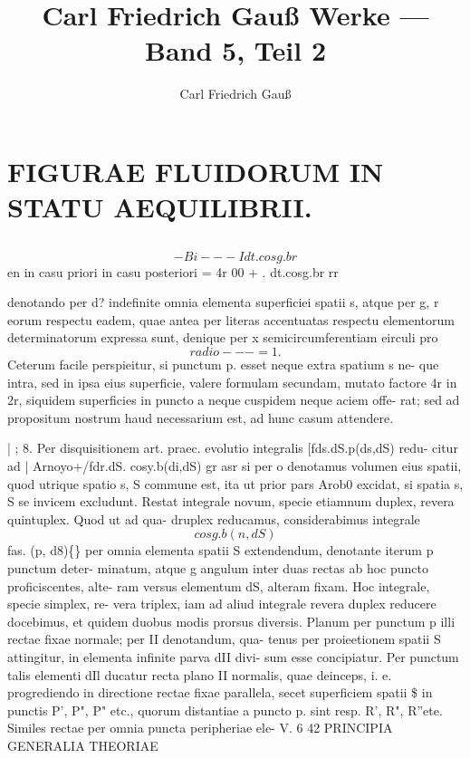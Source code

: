 \documentclass[12pt,a4paper]{article}
\title{Carl Friedrich Gauß Werke --- Band 5, Teil 2}
\author{Carl Friedrich Gauß}
\date{}
\begin{document}
\maketitle
\thispagestyle{fancy}

\section*{FIGURAE FLUIDORUM IN STATU AEQUILIBRII.}

\setcounter{subsection}{7}
\subsection{}


\[                             -          Bi         --- Idt.cosg.br\]
en
in casu priori
in casu posteriori    = 4r 00 + . dt.cosg.br
rr

denotando
per d? indefinite omnia elementa superficiei spatii s, atque per g, r
eorum respectu eadem, quae antea per literas accentuatas respectu elementorum
determinatorum expressa sunt, denique per x semicircumferentiam eirculi pro
\[radio       ---=   1.\]
Ceterum facile perspieitur, si punctum p. esset neque extra spatium s ne-
que intra, sed in ipsa eius superficie, valere formulam secundam, mutato factore
4r in 2r, siquidem superficies in puncto a neque cuspidem neque aciem offe-
rat; sed ad propositum nostrum haud necessarium est, ad hunc casum attendere.

|                ;                          8.
Per disquisitionem art. praec. evolutio integralis       [fds.dS.p(ds,dS) redu-
citur ad                                                       |
Arnoyo+/fdr.dS. cosy.b(di,dS)
gr asr
si per o denotamus volumen eius spatii, quod utrique spatio s, S commune est,
ita ut prior pars Arob0 excidat, si spatia s, S se invicem excludunt.    Restat
integrale novum, specie etiamnum duplex, revera quintuplex.    Quod ut ad qua-
druplex reducamus, considerabimus integrale
\[                                                  cosg.b(n,dS)\]
fas.       (p, d8)\textregistered\{\}
per omnia elementa spatii S extendendum,                   denotante iterum p punctum deter-
minatum, atque g angulum inter duas rectas ab hoc puncto proficiscentes, alte-
ram versus elementum            dS, alteram fixam.         Hoc integrale, specie simplex,   re-
vera triplex, iam ad aliud integrale revera duplex reducere docebimus, et quidem
duobus modis prorsus diversis.
Planum per punctum p illi rectae fixae normale; per II denotandum, qua-
tenus per proieetionem spatii S attingitur, in elementa infinite parva dII divi-
sum esse concipiatur.    Per punctum talis elementi dIl ducatur recta plano II
normalis, quae deinceps, i. e. progrediendo in directione rectae fixae parallela,
secet superficiem spatii \$ in punctis P', P", P" etc., quorum distantiae a puncto
p. sint resp.         R', R", R''ete.    Similes rectae per omnia puncta peripheriae ele-
V.                                                                           6
42                              PRINCIPIA GENERALIA THEORIAE
\end{document}
